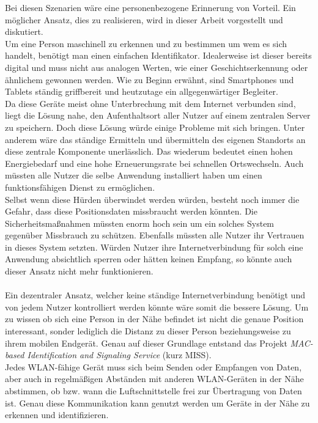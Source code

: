 \documentclass[]{report}
\begin{document}
Bei diesen Szenarien wäre eine personenbezogene Erinnerung von Vorteil. Ein möglicher Ansatz, dies zu realisieren, wird in dieser Arbeit vorgestellt und diskutiert. \\ 
Um eine Person maschinell zu erkennen und zu bestimmen um wem es sich handelt, benötigt man einen einfachen Identifikator. Idealerweise ist dieser bereits digital und muss nicht aus analogen Werten, wie einer Geschichtserkennung oder ähnlichem gewonnen werden. Wie zu Beginn erwähnt, sind Smartphones und Tablets ständig griffbereit und heutzutage ein allgegenwärtiger Begleiter.\\
Da diese Geräte meist ohne Unterbrechung mit dem Internet verbunden sind, liegt die Lösung nahe, den Aufenthaltsort aller Nutzer auf einem zentralen Server zu speichern. Doch diese Lösung würde einige Probleme mit sich bringen. Unter anderem wäre das ständige Ermitteln und übermitteln des eigenen Standorts an diese zentrale Komponente unerlässlich. Das wiederum bedeutet einen hohen Energiebedarf und eine hohe Erneuerungsrate bei schnellen Ortswechseln. Auch müssten alle Nutzer die selbe Anwendung installiert haben um einen funktionsfähigen Dienst zu ermöglichen. \\
Selbst wenn diese Hürden überwindet werden würden, besteht noch immer die Gefahr, dass diese Positionsdaten missbraucht werden könnten. Die Sicherheitsmaßnahmen müssten enorm hoch sein um ein solches System gegenüber Missbrauch zu schützen. Ebenfalls müssten alle Nutzer ihr Vertrauen in dieses System setzten. Würden Nutzer ihre Internetverbindung für solch eine Anwendung absichtlich sperren oder hätten keinen Empfang, so könnte auch dieser Ansatz nicht mehr funktionieren.\\ \\
Ein dezentraler Ansatz, welcher keine ständige Internetverbindung benötigt und von jedem Nutzer kontrolliert werden könnte wäre somit die bessere Lösung. Um zu wissen ob sich eine Person in der Nähe befindet ist nicht die genaue Position interessant, sonder lediglich die Distanz zu dieser Person beziehungsweise zu ihrem mobilen Endgerät. Genau auf dieser Grundlage entstand das Projekt \textit{MAC-based Identification and Signaling Service} (kurz MISS).\\
Jedes WLAN-fähige Gerät muss sich beim Senden oder Empfangen von Daten, aber auch in regelmäßigen Abständen mit anderen WLAN-Geräten in der Nähe abstimmen, ob bzw. wann die Luftschnittstelle frei zur Übertragung von Daten ist. Genau diese Kommunikation kann genutzt werden um Geräte in der Nähe zu erkennen und identifizieren.\\ 
\end{document}
